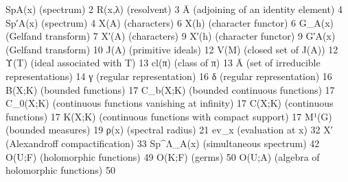 
SpA(x) (spectrum) 2 R(x,λ) (resolvent) 3 Ā (adjoining of an identity element) 4 Sp′A(x) (spectrum) 4 X(A) (characters) 6 X(h) (character functor) 6 G\_A(x) (Gelfand transform) 7 X′(A) (characters) 9 X′(h) (character functor) 9 G′A(x) (Gelfand transform) 10 J(A) (primitive ideals) 12 V(M) (closed set of J(A)) 12 Υ(T) (ideal associated with T) 13 cl(π) (class of π) 13 Ā (set of irreducible representations) 14 γ (regular representation) 16 δ (regular representation) 16 B(X;K) (bounded functions) 17 C\_b(X;K) (bounded continuous functions) 17 C\_0(X;K) (continuous functions vanishing at infinity) 17 C(X;K) (continuous functions) 17 K(X;K) (continuous functions with compact support) 17 M¹(G) (bounded measures) 19 ρ(x) (spectral radius) 21 ev\_x (evaluation at x) 32 X′ (Alexandroff compactification) 33 Sp\^{}Λ\_A(x) (simultaneous spectrum) 42 O(U;F) (holomorphic functions) 49 O(K;F) (germs) 50 O(U;A) (algebra of holomorphic functions) 50



